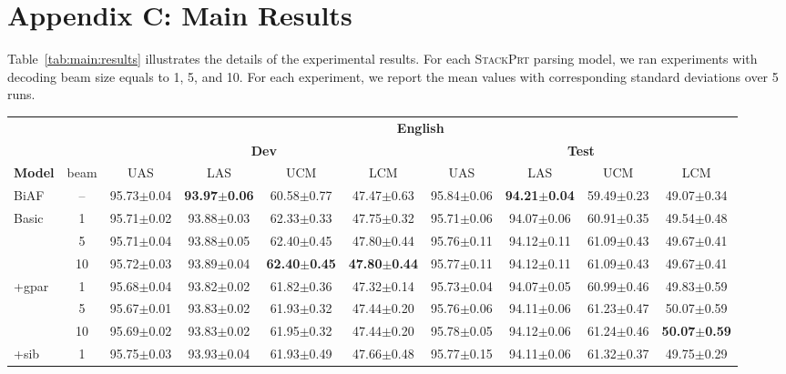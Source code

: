 \documentclass[11pt,a4paper]{article}
\begin{document}
\section*{Appendix C: Main Results}
Table~\ref{tab:main:results} illustrates the details of the experimental results.
For each \textsc{StackPrt} parsing model, we ran experiments with decoding beam size equals to 1, 5, and 10.
For each experiment, we report the mean values with corresponding standard deviations over 5 runs.
\begin{table*}[h]
\centering
\setlength{\tabcolsep}{3pt}
{\small
\begin{tabular}[t]{l|c|cccc|cccc}
\hline
& & \multicolumn{8}{c}{\textbf{English}} \\
\cline{3-10}
& & \multicolumn{4}{c|}{\textbf{Dev}} & \multicolumn{4}{c}{\textbf{Test}} \\
\cline{3-10}
\textbf{Model} & beam & UAS & LAS & UCM & LCM & UAS & LAS & UCM & LCM \\
\hline
BiAF & -- & 95.73$\pm$0.04 & \textbf{93.97$\pm$0.06} & 60.58$\pm$0.77 & 47.47$\pm$0.63 & 95.84$\pm$0.06 & \textbf{94.21$\pm$0.04} & 59.49$\pm$0.23 & 49.07$\pm$0.34 \\
\hline
\hline
\multirow{3}{*}{\textsf{Basic}} & 1 & 95.71$\pm$0.02 & 93.88$\pm$0.03 & 62.33$\pm$0.33 & 47.75$\pm$0.32 & 95.71$\pm$0.06 & 94.07$\pm$0.06 & 60.91$\pm$0.35 & 49.54$\pm$0.48 \\
& 5 & 95.71$\pm$0.04 & 93.88$\pm$0.05 & 62.40$\pm$0.45 & 47.80$\pm$0.44 & 95.76$\pm$0.11 & 94.12$\pm$0.11 & 61.09$\pm$0.43 & 49.67$\pm$0.41 \\
& 10 & 95.72$\pm$0.03 & 93.89$\pm$0.04 & \textbf{62.40$\pm$0.45} & \textbf{47.80$\pm$0.44} & 95.77$\pm$0.11 & 94.12$\pm$0.11 & 61.09$\pm$0.43 & 49.67$\pm$0.41 \\
\hline
\multirow{3}{*}{\textsf{+gpar}} & 1 & 95.68$\pm$0.04 & 93.82$\pm$0.02 & 61.82$\pm$0.36 & 47.32$\pm$0.14 & 95.73$\pm$0.04 & 94.07$\pm$0.05 & 60.99$\pm$0.46 & 49.83$\pm$0.59 \\
& 5 & 95.67$\pm$0.01 & 93.83$\pm$0.02 & 61.93$\pm$0.32 & 47.44$\pm$0.20 & 95.76$\pm$0.06 & 94.11$\pm$0.06 & 61.23$\pm$0.47 & 50.07$\pm$0.59 \\
& 10 & 95.69$\pm$0.02 & 93.83$\pm$0.02 & 61.95$\pm$0.32 & 47.44$\pm$0.20 & 95.78$\pm$0.05 & 94.12$\pm$0.06 & 61.24$\pm$0.46 & \textbf{50.07$\pm$0.59} \\
\hline
\multirow{3}{*}{\textsf{+sib}} & 1 & 95.75$\pm$0.03 & 93.93$\pm$0.04 & 61.93$\pm$0.49 & 47.66$\pm$0.48 & 95.77$\pm$0.15 & 94.11$\pm$0.06 & 61.32$\pm$0.37 & 49.75$\pm$0.29 \\

\end{tabular}}
\end{table*}
\end{document}
